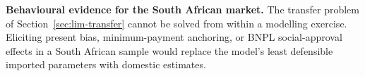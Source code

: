 \textbf{Behavioural evidence for the South African market.} The transfer problem of
Section~\ref{sec:lim-transfer} cannot be solved from within a modelling exercise. Eliciting present
bias, minimum-payment anchoring, or \ac{BNPL} social-approval effects in a South African sample
would replace the model's least defensible imported parameters with domestic estimates.

